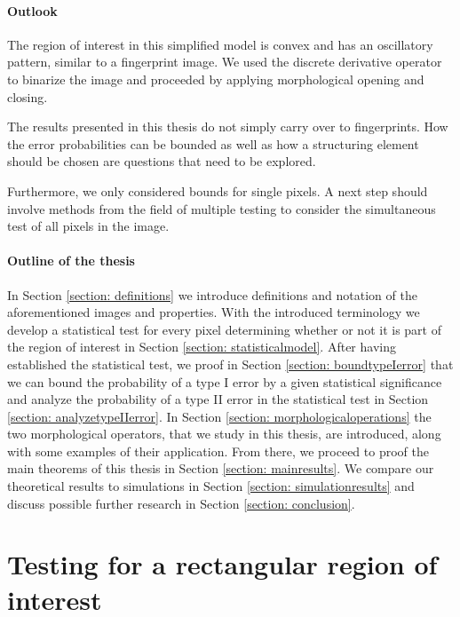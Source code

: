 \documentclass[a4paper,12pt]{article}
\theoremstyle{plain}
\theoremstyle{definition}
\begin{document}
\paragraph{Outlook}

The region of interest in this simplified model is convex and has an oscillatory pattern, similar to a fingerprint image. We used the discrete derivative operator to binarize the image and proceeded by applying morphological opening and closing.

The results presented in this thesis do not simply carry over to fingerprints. How the error probabilities can be bounded as well as how a structuring element should be chosen are questions that need to be explored.

Furthermore, we only considered bounds for single pixels. A next step should involve methods from the field of multiple testing to consider the simultaneous test of all pixels in the image.

\paragraph{Outline of the thesis}

In Section \ref{section: definitions} we introduce definitions and notation of the aforementioned images and properties. With the introduced terminology we develop a statistical test for every pixel determining whether or not it is part of the region of interest in Section \ref{section: statisticalmodel}. After having established the statistical test, we proof in Section \ref{section: boundtypeIerror} that we can bound the probability of a type I error by a given statistical significance and analyze the probability of a type II error in the statistical test in Section \ref{section: analyzetypeIIerror}. In Section \ref{section: morphologicaloperations} the two morphological operators, that we study in this thesis, are introduced, along with some examples of their application. From there, we proceed to proof the main theorems of this thesis in Section \ref{section: mainresults}. We compare our theoretical results to simulations in Section \ref{section: simulationresults} and discuss possible further research in Section \ref{section: conclusion}.

\newpage



\section{Testing for a rectangular region of interest}
\end{document}
